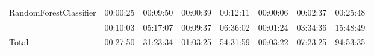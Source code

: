 \begin{table}[H]
{\begin{tabular}{llllllll}
        \multicolumn{1}{l|}{RandomForestClassifier}                         & 00:00:25 & 00:09:50                      & 00:00:39 & 00:12:11                      & 00:00:06 & 00:02:37                      & 00:25:48                \\
        \rowcolor[HTML]{EFEFEF} 
        \multicolumn{1}{l|}{\cellcolor[HTML]{EFEFEF}XGBClassifier}          & 00:10:03 & 05:17:07                      & 00:09:37 & 06:36:02                      & 00:01:24 & 03:34:36                      & 15:48:49                \\
        \multicolumn{1}{l|}{Total}                                          & 00:27:50 & 31:23:34                      & 01:03:25 & 54:31:59                      & 00:03:22 & 07:23:25                      & 94:53:35               
    \end{tabular}}
\end{table}

